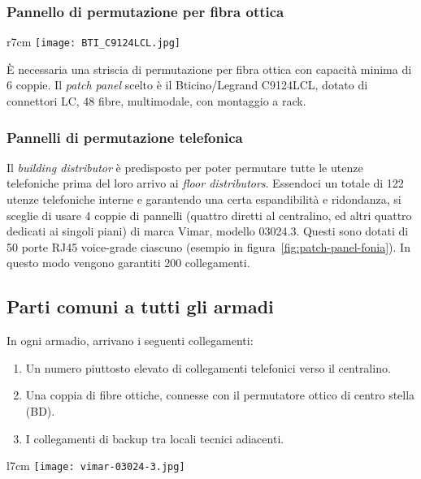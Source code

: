 \newpage
\subsubsection{Pannello di permutazione per fibra ottica}
\begin{wrapfigure}{r}{7cm}
  \centering
  \texttt{[image: BTI\_C9124LCL.jpg]}
  \caption{Il pannello di permutazione per fibra ottica.}\label{fig:patch-panel-fibra}
  \vspace{-1.5cm}
\end{wrapfigure}
È necessaria una striscia di permutazione per fibra ottica con capacità minima di 6 coppie.
Il \textit{patch panel} scelto è il Bticino/Legrand C9124LCL, dotato di connettori LC, 48 fibre, multimodale,
con montaggio a rack.

\subsubsection{Pannelli di permutazione telefonica}
Il \textit{building distributor} è predisposto per poter permutare tutte le utenze telefoniche prima del loro
arrivo ai \textit{floor distributors}. Essendoci un totale di 122 utenze telefoniche interne e garantendo una
certa espandibilità e ridondanza, si sceglie di usare 4 coppie di pannelli (quattro diretti al centralino, ed
altri quattro dedicati ai singoli piani) di marca Vimar, modello 03024.3. Questi sono dotati di 50 porte RJ45
voice-grade ciascuno (esempio in figura~\ref{fig:patch-panel-fonia}). In questo modo vengono garantiti 200 collegamenti.

\subsection{Parti comuni a tutti gli armadi}
In ogni armadio, arrivano i seguenti collegamenti:
\begin{enumerate}
  \item Un numero piuttosto elevato di collegamenti telefonici verso il centralino.
  \item Una coppia di fibre ottiche, connesse con il permutatore ottico di centro stella (BD).
  \item I collegamenti di backup tra locali tecnici adiacenti.
\end{enumerate}

\begin{wrapfigure}{l}{7cm}
  \centering
  \texttt{[image: vimar-03024-3.jpg]}
  \caption{Il pannello di permutazione telefonico.}\label{fig:patch-panel-fonia}
  \vspace{-1cm}
\end{wrapfigure}

